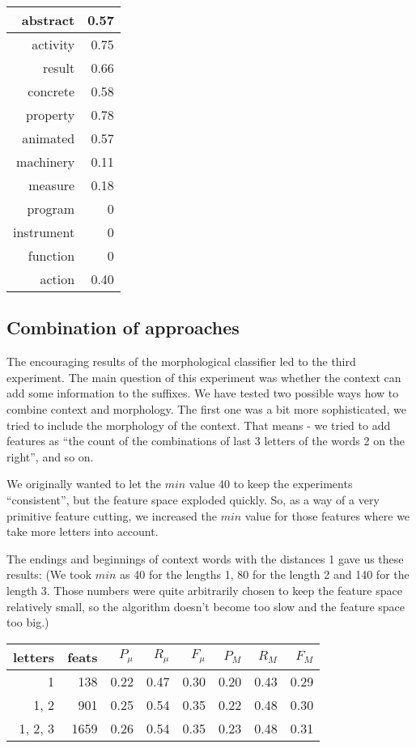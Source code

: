 \documentclass[letterpaper]{article}
\begin{document}
\begin{tabular}{|r|r|}
\hline
abstract & 0.57 \\ \hline
activity & 0.75 \\ \hline
result & 0.66 \\ \hline
concrete & 0.58 \\ \hline
property & 0.78 \\ \hline
animated & 0.57 \\ \hline
machinery & 0.11 \\ \hline
measure & 0.18 \\ \hline
program & 0 \\ \hline
instrument & 0 \\ \hline
function & 0 \\ \hline
action & 0.40 \\ \hline 

\end{tabular}


\subsection{Combination of approaches}
The encouraging results of the morphological classifier led to the third experiment. The main question of this experiment was whether the context can add some information to the suffixes.
We have tested two possible ways how to combine context and morphology. The first one was a bit more sophisticated, we tried to include the morphology of the context. 
That means - we tried to add features as ``the count of the combinations of last 3 letters of the words 2 on the right'', and so on.

We originally wanted to let the $min$ value 40 to keep the experiments ``consistent'',
but the feature space exploded quickly. So, as a way of a very primitive feature cutting,
we increased the $min$ value for those features where we take more letters into account.

The endings and beginnings of context words with the distances 1 gave us these results:
(We took $min$ as 40 for the lengths 1, 80 for the length 2 and 140 for the length 3. 
Those numbers were quite arbitrarily chosen to keep the feature space relatively small, 
so the algorithm doesn't become too slow and the feature space too big.)


\begin{table}[h]


\begin{tabular}{|r|r|r|r|r|r|r|r|}
\hline
letters&feats & $P_\mu$ & $R_\mu$ & $F_\mu$ & $P_M$ & $R_M$  & $F_M$ \\ \hline
1 & 138 & 0.22 & 0.47 & 0.30 & 0.20 & 0.43 & 0.29 \\ \hline
1, 2  & 901 & 0.25 & 0.54 & 0.35 & 0.22 & 0.48 & 0.30 \\ \hline
1, 2, 3  & 1659 & 0.26 & 0.54 & 0.35 & 0.23 & 0.48 & 0.31 \\ \hline

\end{tabular}
\end{table}
\end{document}
